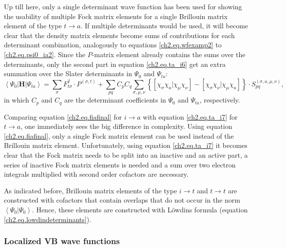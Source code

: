Up till here, only a single determinant wave function has been used for showing the usability of multiple Fock matrix elements for a single Brillouin matrix element of the type $t \rightarrow a$. If multiple determinants would be used, it will become clear that the density matrix elements become sums of contributions for each determinant combination, analogously to equations \ref{ch2.eq.wfexamp2} to \ref{ch2.eq.psi0_ia2}. Since the $P$-matrix element already contains the sums over the determinants, only the second part in equation \ref{ch2.eq.ta_i6} get an extra summation over the Slater determinants in $\Psi_0$ and $\Psi_{ta}$:
\begin{equation}
\left< \Psi_0 | \mathbf{H} | \Psi_{ta} \right> = \sum_{\sigma} F^{I}_{t\sigma} \cdot P^{(\sigma,t)} + \sum_{pq} C_p C_q\sum_{\sigma,\mu,\nu} \left\{ \left[ \chi_\sigma \chi_a | \chi_\mu \chi_\nu \right] - \left[ \chi_\sigma \chi_\nu | \chi_\mu \chi_a \right] \right\} \cdot S_{pq}^{(\sigma,a,\mu,\nu)},
\label{ch2.eq.ta_i7}
\end{equation}
in which $C_p$ and $C_q$ are the determinant coefficients in $\Psi_0$ and $\Psi_{ta}$, respectively. 

Comparing equation \ref{ch2.eq.fiafinal} for $i \rightarrow a$ with equation \ref{ch2.eq.ta_i7} for $t \rightarrow a$, one immediately sees the big difference in complexity. Using equation \ref{ch2.eq.fiafinal}, only a single Fock matrix element can be used instead of the Brillouin matrix element. Unfortunately, using equation \ref{ch2.eq.ta_i7} it becomes clear that the Fock matrix needs to be split into an inactive and an active part, a series of inactive Fock matrix elements is needed and a sum over two electron integrals multiplied with second order cofactors are necessary.

As indicated before, Brillouin matrix elements of the type $i \rightarrow t$ and $t \rightarrow t$ are constructed with cofactors that contain overlaps that do not occur in the norm $\left< \Psi_0 | \Psi_0 \right>$. Hence, these elements are constructed with L\"{o}wdins formula (equation \ref{ch2.eq.lowdindeterminants}).

\subsubsection{\label{ch2.sec.delocal}Localized VB wave functions}

